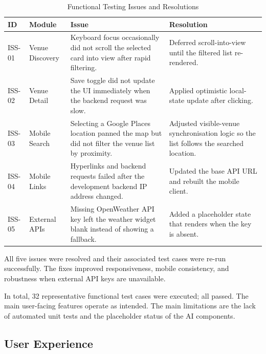 \documentclass[conference]{IEEEtran}
\begin{document}
\begin{table}[htbp]
\caption{Functional Testing Issues and Resolutions}
\label{tab:issues}
\begin{center}
\scriptsize
\setlength{\tabcolsep}{1pt}
\begin{tabular}{@{}|p{}|p{}|p{}|p{}|@{}}
\hline
\textbf{ID} & \textbf{Module} & \textbf{Issue} & \textbf{Resolution} \\
\hline
ISS-01 & Venue Discovery & Keyboard focus occasionally did not scroll the selected card into view after rapid filtering. & Deferred scroll-into-view until the filtered list re-rendered. \\
\hline
ISS-02 & Venue Detail & Save toggle did not update the UI immediately when the backend request was slow. & Applied optimistic local-state update after clicking. \\
\hline
ISS-03 & Mobile Search & Selecting a Google Places location panned the map but did not filter the venue list by proximity. & Adjusted visible-venue synchronisation logic so the list follows the searched location. \\
\hline
ISS-04 & Mobile Links & Hyperlinks and backend requests failed after the development backend IP address changed. & Updated the base API URL and rebuilt the mobile client. \\
\hline
ISS-05 & External APIs & Missing OpenWeather API key left the weather widget blank instead of showing a fallback. & Added a placeholder state that renders when the key is absent. \\
\hline
\end{tabular}
\end{center}
\end{table}

All five issues were resolved and their associated test cases were re-run successfully. The fixes improved responsiveness, mobile consistency, and robustness when external API keys are unavailable.

In total, 32 representative functional test cases were executed; all passed. The main user-facing features operate as intended. The main limitations are the lack of automated unit tests and the placeholder status of the AI components.
\subsection{User Experience}
\end{document}
